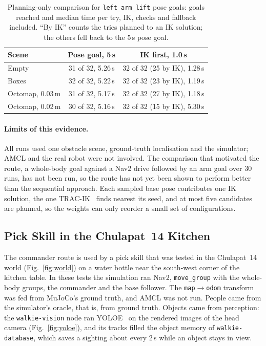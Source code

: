 \documentclass[12pt,a4paper]{article}
\begin{document}
\begin{table}[H]
    \centering
    \small
    \begin{tabular}{lcc}
        \toprule
        Scene & Pose goal, 5\,s & IK first, 1.0\,s \\
        \midrule
        Empty               & 31 of 32, 5.26\,s & 32 of 32 (25 by IK), 1.28\,s \\
        Boxes               & 32 of 32, 5.22\,s & 32 of 32 (23 by IK), 1.19\,s \\
        Octomap, 0.03\,m    & 31 of 32, 5.17\,s & 32 of 32 (27 by IK), 1.18\,s \\
        Octomap, 0.02\,m    & 30 of 32, 5.16\,s & 32 of 32 (15 by IK), 5.30\,s \\
        \bottomrule
    \end{tabular}
    \caption{\small{Planning-only comparison for \texttt{left\_arm\_lift} pose goals: goals reached and
    median time per try, IK, checks and fallback included. ``By IK'' counts the tries planned to an IK
    solution; the others fell back to the 5\,s pose goal.}}
    \label{tab:ik_first}
\end{table}

\paragraph{Limits of this evidence.}
All runs used one obstacle scene, ground-truth localisation and the simulator; AMCL and the real robot
were not involved. The comparison that motivated the route, a whole-body goal against a Nav2 drive
followed by an arm goal over 30 runs, has not been run, so the route has not yet been shown to perform
better than the sequential approach. Each sampled base pose contributes one IK solution, the one
TRAC-IK~\cite{tracik} finds nearest its seed, and at most five candidates are planned, so the weights
can only reorder a small set of configurations.


\subsection{Pick Skill in the Chulapat~14 Kitchen}
\label{sec:pick}

The commander route is used by a pick skill that was tested in the Chulapat~14 world
(Fig.~\ref{fig:world}) on a water bottle near the south-west corner of the kitchen table. In these
tests the simulation ran Nav2, \texttt{move\_group} with the whole-body groups, the commander and the
base follower. The \texttt{map}$\to$\texttt{odom} transform was fed from MuJoCo's ground truth, and
AMCL was not run. People came from the simulator's oracle, that is, from ground truth. Objects came
from perception: the \texttt{walkie-vision} node ran YOLOE~\cite{wang2025yoloe} on the rendered images
of the head camera (Fig.~\ref{fig:yoloe}), and its tracks filled the object memory of
\texttt{walkie-database}, which saves a sighting about every 2\,s while an object stays in view.
\end{document}
